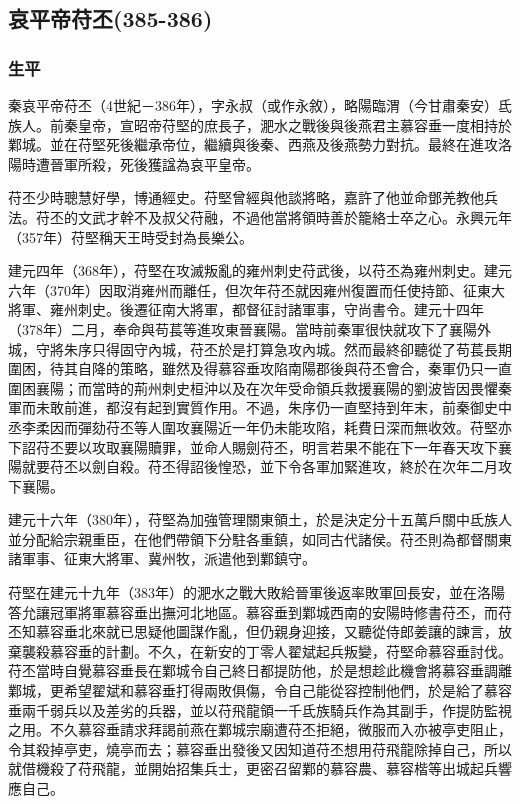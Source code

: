 
\subsection{哀平帝苻丕\tiny(385-386)}

\subsubsection{生平}

秦哀平帝苻丕（4世紀－386年），字永叔（或作永敘），略陽臨渭（今甘肅秦安）氐族人。前秦皇帝，宣昭帝苻堅的庶長子，淝水之戰後與後燕君主慕容垂一度相持於鄴城。並在苻堅死後繼承帝位，繼續與後秦、西燕及後燕勢力對抗。最終在進攻洛陽時遭晉軍所殺，死後獲諡為哀平皇帝。

苻丕少時聰慧好學，博通經史。苻堅曾經與他談將略，嘉許了他並命鄧羌教他兵法。苻丕的文武才幹不及叔父苻融，不過他當將領時善於籠絡士卒之心。永興元年（357年）苻堅稱天王時受封為長樂公。

建元四年（368年），苻堅在攻滅叛亂的雍州刺史苻武後，以苻丕為雍州刺史。建元六年（370年）因取消雍州而離任，但次年苻丕就因雍州復置而任使持節、征東大將軍、雍州刺史。後遷征南大將軍，都督征討諸軍事，守尚書令。建元十四年（378年）二月，奉命與苟萇等進攻東晉襄陽。當時前秦軍很快就攻下了襄陽外城，守將朱序只得固守內城，苻丕於是打算急攻內城。然而最終卻聽從了苟萇長期圍困，待其自降的策略，雖然及得慕容垂攻陷南陽郡後與苻丕會合，秦軍仍只一直圍困襄陽；而當時的荊州刺史桓沖以及在次年受命領兵救援襄陽的劉波皆因畏懼秦軍而未敢前進，都沒有起到實質作用。不過，朱序仍一直堅持到年末，前秦御史中丞李柔因而彈劾苻丕等人圍攻襄陽近一年仍未能攻陷，耗費日深而無收效。苻堅亦下詔苻丕要以攻取襄陽贖罪，並命人賜劍苻丕，明言若果不能在下一年春天攻下襄陽就要苻丕以劍自殺。苻丕得詔後惶恐，並下令各軍加緊進攻，終於在次年二月攻下襄陽。

建元十六年（380年），苻堅為加強管理關東領土，於是決定分十五萬戶關中氐族人並分配給宗親重臣，在他們帶領下分駐各重鎮，如同古代諸侯。苻丕則為都督關東諸軍事、征東大將軍、冀州牧，派遣他到鄴鎮守。

苻堅在建元十九年（383年）的淝水之戰大敗給晉軍後返率敗軍回長安，並在洛陽答允讓冠軍將軍慕容垂出撫河北地區。慕容垂到鄴城西南的安陽時修書苻丕，而苻丕知慕容垂北來就已思疑他圖謀作亂，但仍親身迎接，又聽從侍郎姜讓的諫言，放棄襲殺慕容垂的計劃。不久，在新安的丁零人翟斌起兵叛變，苻堅命慕容垂討伐。苻丕當時自覺慕容垂長在鄴城令自己終日都提防他，於是想趁此機會將慕容垂調離鄴城，更希望翟斌和慕容垂打得兩敗俱傷，令自己能從容控制他們，於是給了慕容垂兩千弱兵以及差劣的兵器，並以苻飛龍領一千氐族騎兵作為其副手，作提防監視之用。不久慕容垂請求拜謁前燕在鄴城宗廟遭苻丕拒絕，微服而入亦被亭吏阻止，令其殺掉亭吏，燒亭而去；慕容垂出發後又因知道苻丕想用苻飛龍除掉自己，所以就借機殺了苻飛龍，並開始招集兵士，更密召留鄴的慕容農、慕容楷等出城起兵響應自己。

